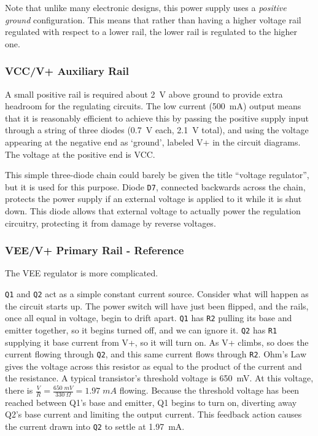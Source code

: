 \begin{multicols}{2}

Note that unlike many electronic designs, this power supply uses a
\emph{positive ground} configuration. This means that rather than having
a higher voltage rail regulated with respect to a lower rail, the lower rail
is regulated to the higher one.

\subsubsection{VCC/V+ Auxiliary Rail}
A small positive rail is required about 2~V above ground to provide extra
headroom for the regulating circuits. The low current (500~mA) output means
that it is reasonably efficient to achieve this by passing the positive
supply input through a string of three diodes (0.7~V each, 2.1~V total), and
using the voltage appearing at the negative end as `ground', labeled V+ in the
circuit diagrams.
The voltage at the positive end is VCC.

This simple three-diode chain could barely be given the title ``voltage
regulator'', but it is used for this purpose.
Diode \texttt{D7}, connected backwards across the chain, protects the power
supply if an external voltage is applied to it while it is shut down. This
diode allows that external voltage to actually power the regulation circuitry,
protecting it from damage by reverse voltages.
\ \\

\subsubsection{VEE/V+ Primary Rail - Reference}
The VEE regulator is more complicated.

\texttt{Q1} and \texttt{Q2} act as a simple constant current source.
Consider what will happen
as the circuit starts up. The power switch will have just been flipped, and the
rails, once all equal in voltage, begin to drift apart.
\texttt{Q1} has \texttt{R2} pulling its base and
emitter together, so it begins turned off, and we can ignore it.
\texttt{Q2} has \texttt{R1} supplying it base current from V+, so it will
turn on. As V+ climbs, so does the current flowing through \texttt{Q2}, and
this same current flows through \texttt{R2}. Ohm's Law gives the voltage
across this resistor as equal to the product of the current and the resistance.
A typical transistor's threshold voltage is 650~mV. At this voltage, there is
$\frac{V}{R} = \frac{650\;mV}{330\;\Omega} = 1.97\;mA$ flowing. Because the
threshold voltage has been reached between \textrm{Q1}'s base and emitter,
\textrm{Q1} begins to turn on, diverting away \textrm{Q2}'s base current and
limiting the output current. This feedback action causes the current drawn
into \texttt{Q2} to settle at 1.97~mA.


\end{multicols}

